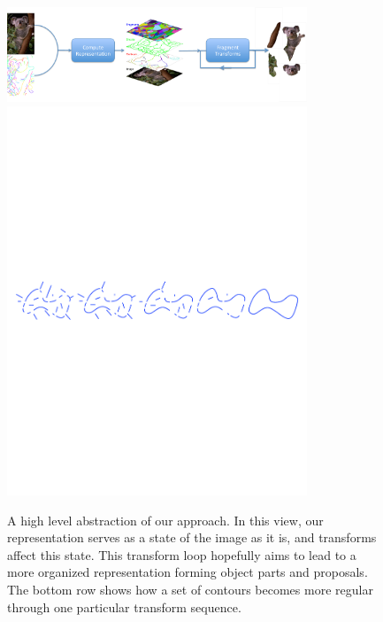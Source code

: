 \begin{figure}[ht]
\center
\includegraphics[width=0.8\textwidth]{figs/flowchart.pdf}
\includegraphics[width=0.8\textwidth]{figs/pocv_sequence.pdf}
\caption{A high level abstraction of our approach. In this view, our representation serves as a state of the image as it is, and transforms affect this state. This transform loop hopefully aims to lead to a more organized representation forming object parts and proposals. The bottom row shows how a set of contours becomes more regular through one particular transform sequence.} 
\label{fig:ma_transforms}
\end{figure}

 
